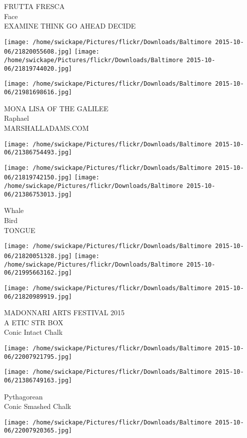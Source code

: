 \documentclass[10pt,letterpaper]{article}
\begin{document}
FRUTTA FRESCA\\
Face\\
EXAMINE THINK GO AHEAD DECIDE
\pagebreak

\texttt{[image: /home/swickape/Pictures/flickr/Downloads/Baltimore 2015-10-06/21820055608.jpg]}
\texttt{[image: /home/swickape/Pictures/flickr/Downloads/Baltimore 2015-10-06/21819744020.jpg]}

\texttt{[image: /home/swickape/Pictures/flickr/Downloads/Baltimore 2015-10-06/21981698616.jpg]}

MONA LISA OF THE GALILEE\\
Raphael\\
MARSHALLADAMS.COM
\pagebreak

\texttt{[image: /home/swickape/Pictures/flickr/Downloads/Baltimore 2015-10-06/21386754493.jpg]}

\vspace{0.25in}
\texttt{[image: /home/swickape/Pictures/flickr/Downloads/Baltimore 2015-10-06/21819742150.jpg]}
\texttt{[image: /home/swickape/Pictures/flickr/Downloads/Baltimore 2015-10-06/21386753013.jpg]}

Whale\\
Bird\\
TONGUE
\pagebreak

\texttt{[image: /home/swickape/Pictures/flickr/Downloads/Baltimore 2015-10-06/21820051328.jpg]}
\texttt{[image: /home/swickape/Pictures/flickr/Downloads/Baltimore 2015-10-06/21995663162.jpg]}

\texttt{[image: /home/swickape/Pictures/flickr/Downloads/Baltimore 2015-10-06/21820989919.jpg]}

MADONNARI ARTS FESTIVAL 2015\\
A ETIC STR BOX\\
Conic Intact Chalk
\pagebreak

\texttt{[image: /home/swickape/Pictures/flickr/Downloads/Baltimore 2015-10-06/22007921795.jpg]}

\vspace{0.25in}
\texttt{[image: /home/swickape/Pictures/flickr/Downloads/Baltimore 2015-10-06/21386749163.jpg]}

Pythagorean\\
Conic Smashed Chalk
\pagebreak

\texttt{[image: /home/swickape/Pictures/flickr/Downloads/Baltimore 2015-10-06/22007920365.jpg]}
\end{document}
